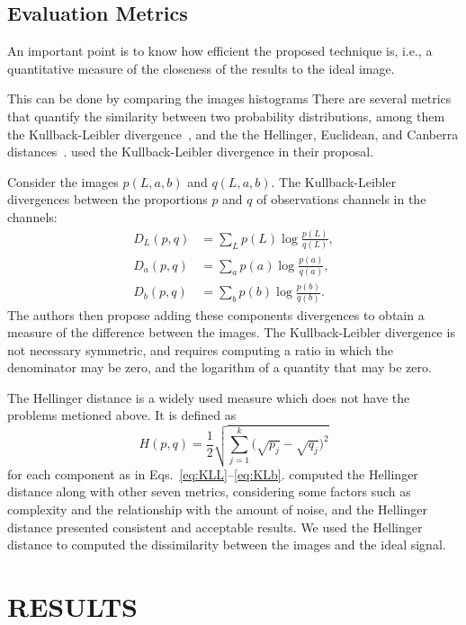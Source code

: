 \documentclass{article}
\begin{document}
\subsection{Evaluation Metrics}

An important point is to know how efficient the proposed technique is, i.e., a quantitative measure of the closeness of the results to the ideal image. 

This can be done by comparing the images histograms
There are several metrics that quantify the similarity between two probability distributions, among them the Kullback-Leibler divergence~\citep{AssessingInformationContentinColorImages}, and the
the Hellinger, 
Euclidean, and Canberra distances~\citep{BanchmarckSimiliraty}.
\citet{AssessingInformationContentinColorImages} used the Kullback-Leibler divergence in their proposal.

Consider the images $p(L, a, b)$ and $q(L, a, b)$.
The Kullback-Leibler divergences between the proportions $p$ and $q$ of observations channels in the channels:
\begin{align}
D_{L}(p,q) & = \sum_{L} p(L) \log\frac{p(L)}{q(L)},\label{eq:KLL}\\
D_{a}(p,q) & = \sum_{a} p(a) \log\frac{p(a)}{q(a)},\label{eq:KLa}\\
D_{b}(p,q) & = \sum_{b} p(b) \log\frac{p(b)}{q(b)}\label{eq:KLb}.
\end{align}
The authors then propose adding these components divergences to obtain a measure of the difference between the images.
The Kullback-Leibler divergence is not necessary symmetric, and requires computing a ratio in which the denominator may be zero, and the logarithm of a quantity that may be zero.

The Hellinger distance is a widely used measure which does not have the problems metioned above.
It is defined as
\begin{equation}
	H(p, q) = \frac{1}{2}\sqrt{\sum_{j=1}^k \big(\sqrt{p_j} - \sqrt{q_j}\big)^2}
\end{equation}
for each component as in Eqs.~\eqref{eq:KLL}--\eqref{eq:KLb}.
\citet{BanchmarckSimiliraty} computed the Hellinger distance along with other seven metrics, considering some factors such as complexity and the relationship with the amount of noise, and the Hellinger distance presented consistent and acceptable results.
We used the Hellinger distance to computed the dissimilarity between the images and the ideal signal.

\section{RESULTS}
\label{Sec:Results}
\end{document}
